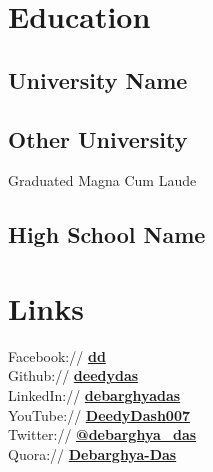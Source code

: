 \documentclass[]{deedy-resume-openfont}
\begin{document}
%
%
\lastupdated

%
%

%
%

\begin{minipage}[t]{0.33\textwidth} 


\section{Education} 

\subsection{University Name}
\sectionsep

\subsection{Other University}
Graduated Magna Cum Laude\\
\sectionsep

\subsection{High School Name}
\sectionsep


\section{Links} 
Facebook:// \href{https://facebook/dd}{\bf dd} \\
Github:// \href{https://github.com/deedydas}{\bf deedydas} \\
LinkedIn://  \href{https://www.linkedin.com/in/debarghyadas}{\bf debarghyadas} \\
YouTube://  \href{https://www.youtube.com/user/DeedyDash007}{\bf DeedyDash007} \\
Twitter://  \href{https://twitter.com/debarghya_das}{\bf @debarghya\_das} \\
Quora://  \href{https://www.quora.com/Debarghya-Das}{\bf Debarghya-Das}


\end{minipage}
\end{document}

